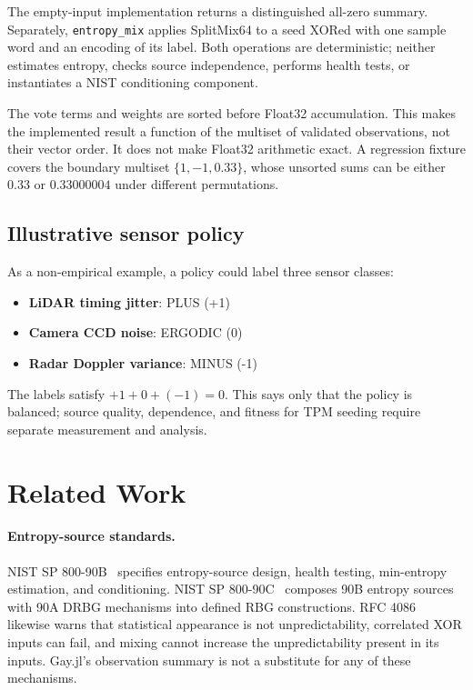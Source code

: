 \documentclass[preprint,nohyperxmp]{iacrtrans}
\begin{document}
The empty-input implementation returns a distinguished all-zero summary.
Separately, \texttt{entropy\_mix} applies SplitMix64 to a seed XORed with one
sample word and an encoding of its label. Both operations are deterministic;
neither estimates entropy, checks source independence, performs health tests,
or instantiates a NIST conditioning component.

The vote terms and weights are sorted before Float32 accumulation. This makes
the implemented result a function of the multiset of validated observations,
not their vector order. It does not make Float32 arithmetic exact. A regression
fixture covers the boundary multiset $\{1,-1,0.33\}$, whose unsorted sums can be
either $0.33$ or $0.33000004$ under different permutations.

\subsection{Illustrative sensor policy}

As a non-empirical example, a policy could label three sensor classes:
\begin{itemize}
    \item \textbf{LiDAR timing jitter}: PLUS (+1)
    \item \textbf{Camera CCD noise}: ERGODIC (0)
    \item \textbf{Radar Doppler variance}: MINUS (-1)
\end{itemize}

The labels satisfy $+1 + 0 + (-1) = 0$. This says only that the policy is
balanced; source quality, dependence, and fitness for TPM seeding require
separate measurement and analysis.

\section{Related Work}
\label{sec:related}

\paragraph{Entropy-source standards.} NIST SP 800-90B~\cite{nist80090b}
specifies entropy-source design, health testing, min-entropy estimation, and
conditioning. NIST SP 800-90C~\cite{nist80090c} composes 90B entropy sources
with 90A DRBG mechanisms into defined RBG constructions. RFC 4086
~\cite{rfc4086} likewise warns that statistical appearance is not
unpredictability, correlated XOR inputs can fail, and mixing cannot increase
the unpredictability present in its inputs. Gay.jl's observation summary is
not a substitute for any of these mechanisms.
\end{document}
